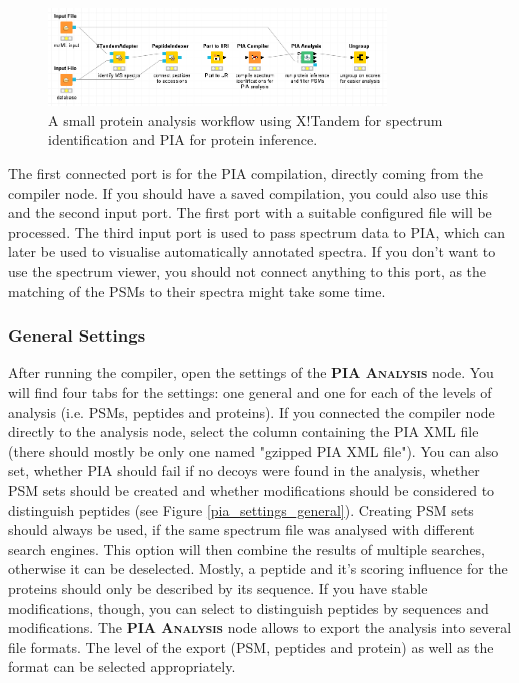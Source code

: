 \documentclass[a4paper,11pt,twoside]{article}
\newcommand{\knimenode}[1]{{\scshape\bfseries #1}}
\begin{document}
\begin{figure}[ht!]
	\centering
	\includegraphics[width=0.8\textwidth]{graphics/first_analysis_workflow}
	\caption{A small protein analysis workflow using X!Tandem for spectrum
	identification and PIA for protein inference.}
\end{figure}

The first connected port is for the PIA compilation, directly coming from the
compiler node. If you should have a saved compilation, you could also use this
and  the second input port. The first port with a suitable configured file will
be processed. The third input port is used to pass spectrum data to PIA, which
can later be used to visualise automatically annotated spectra. If you don't
want to use the spectrum viewer, you should not connect anything to this port,
as the matching of the PSMs to their spectra might take some time.


\subsubsection{General Settings}

After running the compiler, open the settings of the \knimenode{PIA Analysis}
node. You will find four tabs for the settings: one general and one for each of
the levels of analysis (i.e. PSMs, peptides and proteins). If you connected the
compiler node directly to the analysis node, select the column containing the
PIA XML file (there should mostly be only one named "gzipped PIA XML file").
You can also set, whether PIA should fail if no decoys were found in the
analysis, whether PSM sets should be created and whether modifications should
be considered to distinguish peptides (see Figure \ref{pia_settings_general}).
Creating PSM sets should always be used, if the same spectrum file was analysed
with different search engines. This option will then combine the results of
multiple searches, otherwise it can be deselected. Mostly, a peptide and it's
scoring influence for the proteins should only be described by its sequence. If
you have stable modifications, though, you can select to distinguish peptides
by sequences and modifications. The \knimenode{PIA Analysis} node allows to
export the analysis into several file formats. The level of the export (PSM,
peptides and protein) as well as the format can be selected appropriately.
\end{document}
